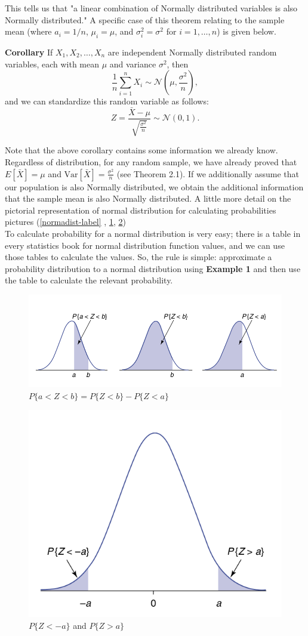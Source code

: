 \documentclass[12pt,a4paper]{article}
\theoremstyle{example}
\theoremstyle{definition}
\theoremstyle{theorem}
\begin{document}
This tells us that "a linear combination of Normally distributed variables is also Normally distributed." A specific case of this theorem relating to the sample mean (where \(a_i = 1/n\), \(\mu_i = \mu\), and \(\sigma_i^2 = \sigma^2\) for \(i = 1, \ldots, n\)) is given below.

\textbf{Corollary } If \(X_1, X_2, \ldots, X_n\) are independent Normally distributed random variables, each with mean \(\mu\) and variance \(\sigma^2\), then
\[
\frac{1}{n} \sum_{i=1}^{n} X_i \sim \mathcal{N}\left(\mu, \frac{\sigma^2}{n}\right),
\]
and we can standardize this random variable as follows:
\[
Z = \frac{\bar{X} - \mu}{\sqrt{\frac{\sigma^2}{n}}} \sim \mathcal{N}(0, 1).
\]

Note that the above corollary contains some information we already know. Regardless of distribution, for any random sample, we have already proved that \(E[\bar{X}] = \mu\) and \(\text{Var}[\bar{X}] = \frac{\sigma^2}{n}\) (see Theorem 2.1). If we additionally assume that our population is also Normally distributed, we obtain the additional information that the sample mean is also Normally distributed.
A little more detail on the pictorial representation of normal distribution for calculating probabilities
 pictures (\ref{normadist-label} , \ref{noraml exmaple}, \ref{avaluelabel})\\
To calculate probability for a normal distribution is very easy; there is a table in every statistics book for normal distribution function values, and we can use those tables to calculate the values. So, the rule is simple: approximate a probability distribution to a normal distribution using \textbf{Example 1} and then use the table to calculate the relevant probability.\citealp[pg-273]{ross2017introductory}
\begin{figure}
    \centering
    \includegraphics[width=.7\textwidth]{Screenshot from 2023-11-13 15-40-54.png}
    \caption{$P\{a<Z<b\} = P \{Z < b\} - P \{Z < a\}$}
    \label{noraml exmaple}
\end{figure}
\begin{figure}
    \centering
    \includegraphics[width=.6\textwidth]{avalue.png}
    \caption{$P\{Z<-a\}$ and $P\{Z>a\}$}
    \label{avaluelabel}
\end{figure}
\end{document}
